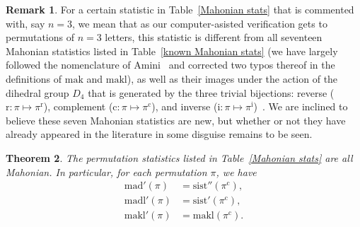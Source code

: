 \documentclass[12pt]{amsart}
\numberwithin{equation}{section}
\theoremstyle{plain}
\newtheorem{theorem}{Theorem}[section]
\theoremstyle{definition}
\newtheorem{remark}[theorem]{Remark}
\def\cc{\mathrm{c}}
\def\r{\mathrm{r}}
\def\i{\mathrm{i}}
\def\mak{\mathrm{mak}}
\def\mad{\mathrm{mad}}
\def\mak{\mathrm{mak}}
\def\makl{\mathrm{makl}}
\def\madl{\mathrm{madl}}
\def\sist{\mathrm{sist}}
\def\sist{\mathrm{sist}}
\begin{document}
\begin{remark}
For a certain statistic in Table~\ref{Mahonian stats} that is commented with, say $n=3$, we mean that as our computer-asisted verification gets to permutations of $n=3$ letters, this statistic is different from all seventeen Mahonian statistics listed in Table~\ref{known Mahonian stats} (we have largely followed the nomenclature of Amini~\cite[Tab.~1]{Am} and corrected two typos thereof in the definitions of $\mak$ and $\makl$), as well as their images under the action of the dihedral group $D_4$ that is generated by the three trivial bijections: reverse ($\r:\pi\mapsto\pi^{\r}$), complement ($\cc:\pi\mapsto\pi^{\cc}$), and inverse ($\i:\pi\mapsto\pi^{\i}$)~\cite[Defn.~1.0.12]{Kit}. We are inclined to believe these seven Mahonian statistics are new, but whether or not they have already appeared in the literature in some disguise remains to be seen.
\end{remark}

\begin{theorem}\label{thm:Mahon stats}
The permutation statistics listed in Table~\ref{Mahonian stats} are all Mahonian. In particular, for each permutation $\pi$, we have
\begin{align}
\label{mad=sist}\mad'(\pi) &= \sist''(\pi^{\cc}),\\
\label{madl=sist}\madl'(\pi) &= \sist'(\pi^{\cc}),\\
\label{makl'=makl^c}\makl'(\pi) &= \makl(\pi^{\cc}).
\end{align}
\end{theorem}
\end{document}
